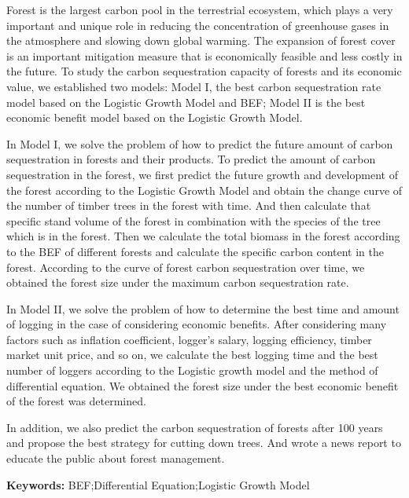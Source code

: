 \documentclass[12pt]{article}
\begin{document}
{\large 	Forest is the largest carbon pool in the terrestrial ecosystem, which plays a very important and unique role
    in reducing the concentration of greenhouse gases in the atmosphere and slowing down global warming.
    The expansion of forest cover is an important mitigation measure that is economically feasible and less costly in the future.
    To study the carbon sequestration capacity of forests and its economic value,
    we established two models: Model I, the best carbon sequestration rate model based on the Logistic Growth Model and BEF;
    Model II is the best economic benefit model based on the Logistic Growth Model.

    In Model I, we solve the problem of how to predict the future amount of carbon
    sequestration in forests and their products. To predict the amount of carbon
    sequestration in the forest, we first predict the future growth and development
    of the forest according to the Logistic Growth Model and obtain the change
    curve of the number of timber trees in the forest with time. And then calculate
    that specific stand volume of the forest in combination with the species of the
    tree which is in the forest. Then we calculate the total biomass in the forest
    according to the BEF of different forests and calculate the specific carbon
    content in the forest. According to the curve of forest carbon sequestration
    over time, we obtained the forest size under the maximum carbon sequestration
    rate.

    In Model II, we solve the problem of how to determine the best time and amount
    of logging in the case of considering economic benefits. After considering many
    factors such as inflation coefficient, logger's salary, logging efficiency,
    timber market unit price, and so on, we calculate the best logging time and the
    best number of loggers according to the Logistic growth model and the method of
    differential equation. We obtained the forest size under the best economic
    benefit of the forest was determined.

    In addition, we also predict the carbon sequestration of forests after 100
    years and propose the best strategy for cutting down trees. And wrote a news
    report to educate the public about forest management.}

\begin{table}[b]%
    \noindent\textbf{Keywords:} BEF\cite{Fang};Differential Equation;Logistic Growth Model
\end{table}
\setcounter{page}{1} %
\clearpage
\pagestyle{fancy}
\tableofcontents
\newpage
\end{document}
